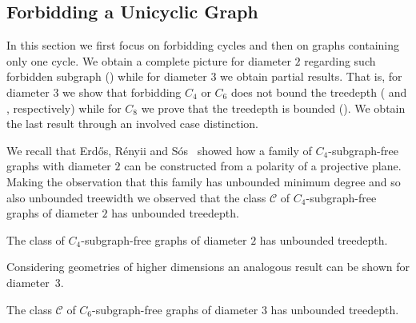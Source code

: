 \documentclass[runningheads,envcountsame]{llncs}
\begin{document}
 
\subsection{Forbidding a Unicyclic Graph}\label{sec:unicyclic} 
In this section 
we first focus on forbidding cycles and then on graphs containing only one cycle. We obtain a complete picture for diameter $2$ regarding such forbidden subgraph () while for diameter $3$ we obtain partial results.
That is, for diameter $3$ we show that forbidding $C_4$ or $C_6$ does not bound the treedepth ( and , respectively) while for $C_8$ we prove that the treedepth is bounded (). We obtain the last result through an involved case distinction.

We recall that Erd{\H{o}}s, R{\'e}nyii and S{\'o}s~\cite{ERTS66} showed how a family of $C_4$-subgraph-free graphs with diameter $2$ can be constructed from a polarity of a projective plane. Making the observation that this family has unbounded minimum degree and so also unbounded treewidth we observed that the class $\mathcal{C}$ of $C_{4}$-subgraph-free graphs of diameter $2$ has unbounded treedepth.


\begin{theorem}
\label{thm:c4}
    The class of $C_{4}$-subgraph-free graphs of diameter $2$ has unbounded treedepth.
\end{theorem}


Considering geometries of higher dimensions an analogous result can be shown for diameter~3.

\begin{theorem}
\label{thm:c6}
    The class $\mathcal{C}$ of $C_{6}$-subgraph-free graphs of diameter $3$ has unbounded treedepth.
\end{theorem}
\end{document}
